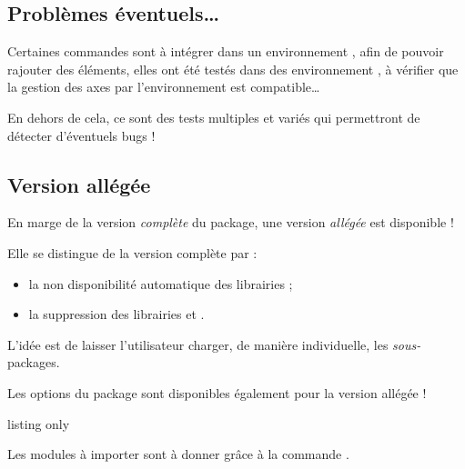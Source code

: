 \subsection{Problèmes éventuels\ldots}

\begin{noteblock}
Certaines \textsf{commandes} sont à intégrer dans un environnement \TikZ, afin de pouvoir rajouter des éléments, elles ont été testés dans des environnement , à vérifier que la gestion des axes par l'environnement  est compatible\ldots

\smallskip

En dehors de cela, ce sont des tests multiples et variés qui permettront de détecter d'éventuels bugs !
\end{noteblock}

\subsection{Version allégée}

\begin{cautionblock}
En marge de la version \textit{complète} du package, une version \textit{allégée} est disponible !

Elle se distingue de la version complète par :

\begin{itemize}
	\item la non disponibilité automatique des librairies ;
	\item la suppression des librairies  et .
\end{itemize}
\end{cautionblock}

\begin{importantblock}
L'idée est de laisser l'utilisateur charger, de manière individuelle, les \textit{sous-}packages.

Les options du package  sont disponibles également pour la version allégée !
\end{importantblock}

\begin{PresCodeTexPL}{listing only}
\usepackage[options]{ProfLycee-Light}
\end{PresCodeTexPL}

\begin{importantblock}
Les modules à importer sont à donner grâce à la commande .
\end{importantblock}

